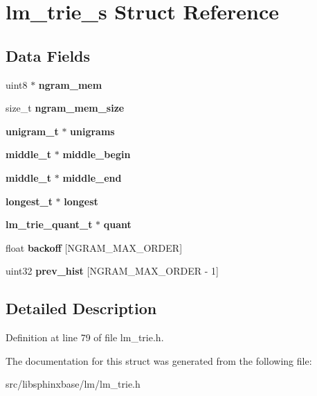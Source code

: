\section{lm\+\_\+trie\+\_\+s Struct Reference}
\label{structlm__trie__s}
\subsection*{Data Fields}
\begin{DoxyCompactItemize}
\item 
\mbox{\label{structlm__trie__s_a58167a5c232538cebd3e083a097a9a1b}} 
uint8 $\ast$ {\bfseries ngram\+\_\+mem}
\item 
\mbox{\label{structlm__trie__s_af256466f3eff8c3b665f10200815ba1d}} 
size\+\_\+t {\bfseries ngram\+\_\+mem\+\_\+size}
\item 
\mbox{\label{structlm__trie__s_a22667bd186be6bf3804a3a597c96bd93}} 
\textbf{ unigram\+\_\+t} $\ast$ {\bfseries unigrams}
\item 
\mbox{\label{structlm__trie__s_aa4a224213e7c1f5fcdb8b15169c237de}} 
\textbf{ middle\+\_\+t} $\ast$ {\bfseries middle\+\_\+begin}
\item 
\mbox{\label{structlm__trie__s_a7f39ce792b398ba89e5db14a895189e9}} 
\textbf{ middle\+\_\+t} $\ast$ {\bfseries middle\+\_\+end}
\item 
\mbox{\label{structlm__trie__s_ade570f476da0d4fb1d865a7eb4285a3b}} 
\textbf{ longest\+\_\+t} $\ast$ {\bfseries longest}
\item 
\mbox{\label{structlm__trie__s_a0a25fcb4269d21eba7596524b4f39bbd}} 
\textbf{ lm\+\_\+trie\+\_\+quant\+\_\+t} $\ast$ {\bfseries quant}
\item 
\mbox{\label{structlm__trie__s_a467064aa205c77cd01be1d3a4fdd1e6d}} 
float {\bfseries backoff} [N\+G\+R\+A\+M\+\_\+\+M\+A\+X\+\_\+\+O\+R\+D\+ER]
\item 
\mbox{\label{structlm__trie__s_a6fa20cf38b39cdb469d6bfc84a3cd927}} 
uint32 {\bfseries prev\+\_\+hist} [N\+G\+R\+A\+M\+\_\+\+M\+A\+X\+\_\+\+O\+R\+D\+ER -\/ 1]
\end{DoxyCompactItemize}


\subsection{Detailed Description}


Definition at line 79 of file lm\+\_\+trie.\+h.



The documentation for this struct was generated from the following file\+:\begin{DoxyCompactItemize}
\item 
src/libsphinxbase/lm/lm\+\_\+trie.\+h\end{DoxyCompactItemize}
